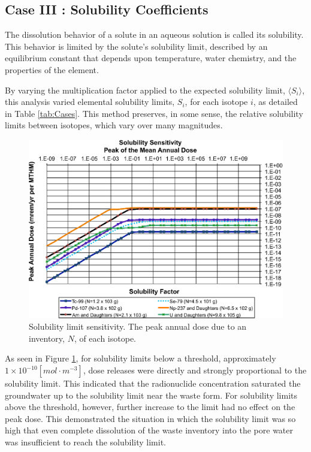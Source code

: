 
\subsection{Case III : Solubility Coefficients}

The dissolution behavior of a solute in an aqueous solution is called its 
solubility. This behavior is limited by the solute's solubility limit, described  
by an equilibrium constant that depends upon temperature, water chemistry, and 
the properties of the element. 

By varying the multiplication factor applied to the expected solubility limit, 
$\langle S_i\rangle$, this analysis varied elemental solubility limits, $S_i$, 
for each isotope $i$, as detailed in Table \ref{tab:Cases}.
This method preserves, in some sense, the relative solubility 
limits between isotopes, which vary over many magnitudes.

\begin{figure}[H]
  \centering
  \includegraphics[width=\linewidth]{solubility.eps}
  \caption{Solubility limit sensitivity. The peak annual dose due to an 
  inventory, 
  $N$, of each isotope.}
  \label{fig:SolSum}
\end{figure}

As seen in Figure \ref{fig:SolSum}, for solubility limits below a threshold, 
approximately $1\times10^{-10}[mol\cdot m^{-3}]$, dose releases were directly 
and strongly proportional to the solubility limit. This indicated that the 
radionuclide concentration saturated the groundwater up to the solubility limit 
near the waste form.  For solubility limits above the threshold, however, 
further increase to the limit had no effect on the peak dose. This demonstrated 
the situation in which the solubility limit was so high that even complete 
dissolution of the waste inventory into the pore water was insufficient to reach 
the solubility limit.

